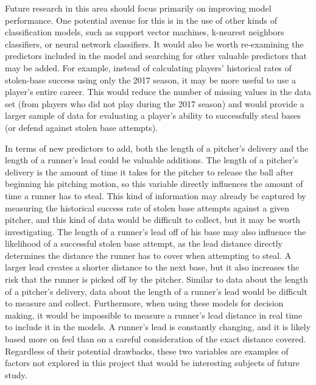 \documentclass{article}
\begin{document}
Future research in this area should focus primarily on improving model performance. One potential avenue for this is in the use of other kinds of classification models, such as support vector machines, k-nearest neighbors classifiers, or neural network classifiers. It would also be worth re-examining the predictors included in the model and searching for other valuable predictors that may be added. For example, instead of calculating players’ historical rates of stolen-base success using only the 2017 season, it may be more useful to use a player’s entire career. This would reduce the number of missing values in the data set (from players who did not play during the 2017 season) and would provide a larger sample of data for evaluating a player’s ability to successfully steal bases (or defend against stolen base attempts). 

In terms of new predictors to add, both the length of a pitcher's delivery and the length of a runner's lead could be valuable additions. The length of a pitcher’s delivery is the amount of time it takes for the pitcher to release the ball after beginning his pitching motion, so this variable directly influences the amount of time a runner has to steal. This kind of information may already be captured by measuring the historical success rate of stolen base attempts against a given pitcher, and this kind of data would be difficult to collect, but it may be worth investigating. The length of a runner's lead off of his base may also influence the likelihood of a successful stolen base attempt, as the lead distance directly determines the distance the runner has to cover when attempting to steal. A larger lead creates a shorter distance to the next base, but it also increases the risk that the runner is picked off by the pitcher. Similar to data about the length of a pitcher's delivery, data about the length of a runner's lead would be difficult to measure and collect. Furthermore, when using these models for decision making, it would be impossible to measure a runner's lead distance in real time to include it in the models. A runner's lead is constantly changing, and it is likely based more on feel than on a careful consideration of the exact distance covered. Regardless of their potential drawbacks, these two variables are examples of factors not explored in this project that would be interesting subjects of future study.
\end{document}
